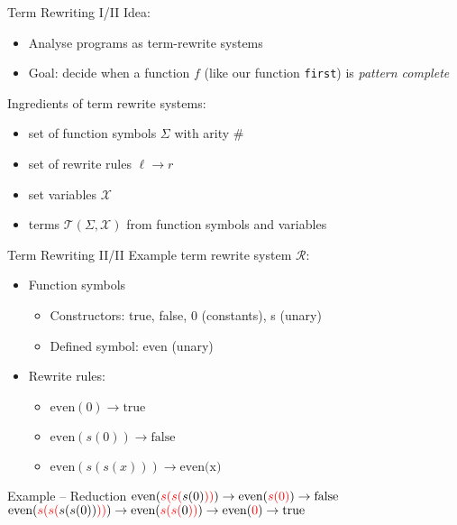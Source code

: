 \begin{frame}{Term Rewriting I/II}
Idea:
    \begin{itemize}
        \item Analyse programs as term-rewrite systems
        \item Goal: decide when a function $f$ (like our function \texttt{first}) is \textit{pattern complete}
    \end{itemize}

Ingredients of term rewrite systems:

\begin{itemize}
    \item set of function symbols $\Sigma$ with arity $\#$
    \item set of rewrite rules $\ell \rightarrow r$
    \item set variables $\mathcal{X}$
    \item terms $\mathcal{T}(\Sigma, \mathcal{X})$ from function symbols and variables
\end{itemize}
\end{frame}

\begin{frame}{Term Rewriting II/II}
Example term rewrite system $\mathcal{R}$:

\begin{itemize}
    \item Function symbols
    \begin{itemize}
        \item Constructors: true, false, 0 (constants), s (unary)
        \item Defined symbol: even (unary)
    \end{itemize}
    \item Rewrite rules:
    \begin{itemize}
        \item $\text{even}(0) \rightarrow \text{true}$
        \item $\text{even}(s(0)) \rightarrow \text{false}$ 
        \item $\text{even}(s(s(x))) \rightarrow \text{even(x)}$
    \end{itemize}
\end{itemize}

\begin{block}{Example – Reduction}
$\text{even}(\textcolor{red}{s(s(}s(0)\textcolor{red}{))}) \rightarrow \text{even}(\textcolor{red}{s(0)}) \rightarrow \text{false}$ \\

$\text{even}(\textcolor{red}{s(s(}s(s(0))\textcolor{red}{))}) \rightarrow \text{even}(\textcolor{red}{s(s(}0\textcolor{red}{))}) \rightarrow \text{even}(\textcolor{red}{0}) \rightarrow \text{true}$
\end{block}


\end{frame}

